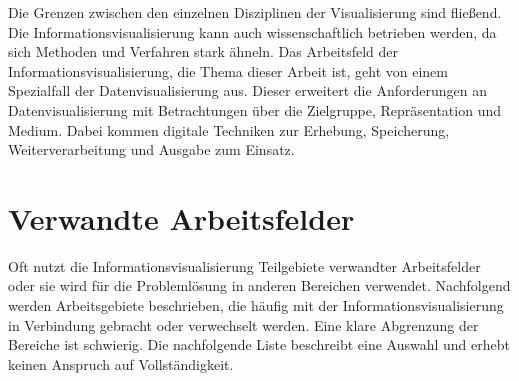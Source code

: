 \documentclass[a4paper, 12pt, DIV=calc, version=first, pdftex, headsepline, footsepline, bibtotocnumbered, liststotocnumbered]{scrreprt}
\begin{document}
Die Grenzen zwischen den einzelnen Disziplinen der Visualisierung sind fließend. Die Informationsvisualisierung kann
auch wissenschaftlich betrieben werden, da sich Methoden und Verfahren stark ähneln.
Das Arbeitsfeld der Informationsvisualisierung, die Thema dieser Arbeit ist,
geht von einem Spezialfall der Datenvisualisierung aus. Dieser erweitert die Anforderungen an Datenvisualisierung mit
Betrachtungen über die Zielgruppe, Repräsentation und Medium. Dabei kommen digitale
Techniken zur Erhebung, Speicherung, Weiterverarbeitung und Ausgabe zum Einsatz.

\section{Verwandte Arbeitsfelder}
\label{sec:Arbeitsfelder}
Oft nutzt die Informationsvisualisierung Teilgebiete verwandter Arbeitsfelder oder sie wird für die Problemlösung
in anderen Bereichen verwendet.
Nachfolgend werden Arbeitsgebiete beschrieben, die häufig mit der Informationsvisualisierung in Verbindung
gebracht oder verwechselt werden. Eine klare Abgrenzung der Bereiche ist schwierig. Die nachfolgende Liste beschreibt
eine Auswahl und erhebt keinen Anspruch auf Vollständigkeit.
\end{document}
